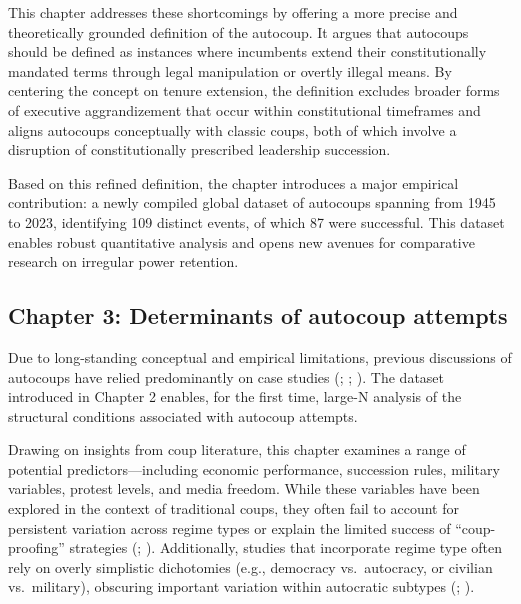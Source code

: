 \documentclass[
  12pt,
]{report}
\begin{document}
This chapter addresses these shortcomings by offering a more precise and
theoretically grounded definition of the autocoup. It argues that
autocoups should be defined as instances where incumbents extend their
constitutionally mandated terms through legal manipulation or overtly
illegal means. By centering the concept on tenure extension, the
definition excludes broader forms of executive aggrandizement that occur
within constitutional timeframes and aligns autocoups conceptually with
classic coups, both of which involve a disruption of constitutionally
prescribed leadership succession.

Based on this refined definition, the chapter introduces a major
empirical contribution: a newly compiled global dataset of autocoups
spanning from 1945 to 2023, identifying 109 distinct events, of which 87
were successful. This dataset enables robust quantitative analysis and
opens new avenues for comparative research on irregular power retention.

\subsection*{Chapter 3: Determinants of autocoup
attempts}\label{chapter-3-determinants-of-autocoup-attempts}

Due to long-standing conceptual and empirical limitations, previous
discussions of autocoups have relied predominantly on case studies
(;
;
). The dataset
introduced in Chapter 2 enables, for the first time, large-N analysis of
the structural conditions associated with autocoup attempts.

Drawing on insights from coup literature, this chapter examines a range
of potential predictors---including economic performance, succession
rules, military variables, protest levels, and media freedom. While
these variables have been explored in the context of traditional coups,
they often fail to account for persistent variation across regime types
or explain the limited success of ``coup-proofing'' strategies
(;
). Additionally, studies that
incorporate regime type often rely on overly simplistic dichotomies
(e.g., democracy vs.~autocracy, or civilian vs.~military), obscuring
important variation within autocratic subtypes
(;
).
\end{document}
